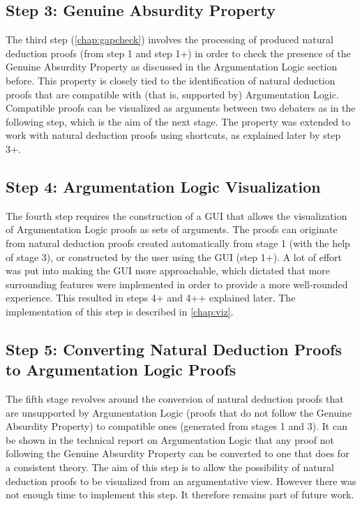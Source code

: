 \documentclass[11pt,twoside,a4paper]{report}
\begin{document}
\subsection{Step 3: Genuine Absurdity Property}
The third step (\autoref{chap:gapcheck}) involves the processing of produced natural deduction proofs (from step 1 and step 1+) in order to check the presence of the Genuine Absurdity Property as discussed in the Argumentation Logic section before. This property is closely tied to the identification of natural deduction proofs that are compatible with (that is, supported by) Argumentation Logic. Compatible proofs can be visualized as arguments between two debaters as in the following step, which is the aim of the next stage. The property was extended to work with natural deduction proofs using shortcuts, as explained later by step 3+.

\subsection{Step 4: Argumentation Logic Visualization}
The fourth step requires the construction of a GUI that allows the visualization of Argumentation Logic proofs as sets of arguments. The proofs can originate from natural deduction proofs created automatically from stage 1 (with the help of stage 3), or constructed by the user using the GUI (step 1+). A lot of effort was put into making the GUI more approachable, which dictated that more surrounding features were implemented in order to provide a more well-rounded experience. This resulted in steps 4+ and 4++ explained later. The implementation of this step is described in \autoref{chap:viz}.

\subsection{Step 5: Converting Natural Deduction Proofs to Argumentation Logic Proofs}
The fifth stage revolves around the conversion of natural deduction proofs that are unsupported by Argumentation Logic (proofs that do not follow the Genuine Absurdity Property) to compatible ones (generated from stages 1 and 3). It can be shown in the technical report on Argumentation Logic that any proof not following the Genuine Absurdity Property can be converted to one that does for a consistent theory. The aim of this step is to allow the possibility of natural deduction proofs to be visualized from an argumentative view. However there was not enough time to implement this step. It therefore remains part of future work.
\end{document}
